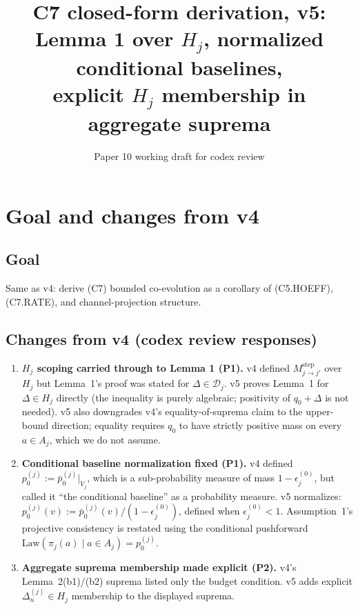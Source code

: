 \documentclass{article}
\title{C7 closed-form derivation, v5: \\
Lemma 1 over $H_j$, normalized conditional baselines, \\
explicit $H_j$ membership in aggregate suprema}
\author{Paper 10 working draft for codex review}
\date{}
\begin{document}
\maketitle

\section{Goal and changes from v4}

\subsection{Goal}

Same as v4: derive (C7) bounded co-evolution as a corollary of
(C5.HOEFF), (C7.RATE), and channel-projection structure.

\subsection{Changes from v4 (codex review responses)}

\begin{enumerate}
\item \textbf{$H_j$ scoping carried through to Lemma 1 (P1).}  v4
  defined $M_{j \to j'}^{\mathrm{step}}$ over $H_j$ but Lemma~1's
  proof was stated for $\Delta \in \mathcal{D}_j$.  v5 proves
  Lemma~1 for $\Delta \in H_j$ directly (the inequality is purely
  algebraic; positivity of $q_0 + \Delta$ is not needed).  v5 also
  downgrades v4's equality-of-suprema claim to the upper-bound
  direction; equality requires $q_0$ to have strictly positive
  mass on every $a \in A_j$, which we do not assume.

\item \textbf{Conditional baseline normalization fixed (P1).}  v4
  defined $p_0^{(j)} := \bar{p}_0^{(j)}|_{V_j}$, which is a
  sub-probability measure of mass $1 - \epsilon_j^{(0)}$, but
  called it ``the conditional baseline'' as a probability measure.
  v5 normalizes: $p_0^{(j)}(v) := \bar{p}_0^{(j)}(v) / (1 -
  \epsilon_j^{(0)})$, defined when $\epsilon_j^{(0)} < 1$.
  Assumption~1's projective consistency is restated using the
  conditional pushforward
  $\mathrm{Law}(\pi_j(a) \mid a \in A_j) = p_0^{(j)}$.

\item \textbf{Aggregate suprema membership made explicit (P2).}
  v4's Lemma~2(b1)/(b2) suprema listed only the budget condition.
  v5 adds explicit $\Delta_n^{(j)} \in H_j$ membership to the
  displayed suprema.
\end{enumerate}
\end{document}
